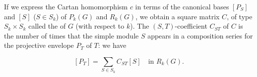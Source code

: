 If we express the Cartan homomorphism $c$ in terms of the canonical bases $[P_S]$ and $[S]$ ($S \in S_k$) of $P_k(G)$ and $R_k(G)$, we obtain a square matrix $C$, of type $S_k \times S_k$ called the  of $G$ (with respect to $k$). The $(S,T)$-coefficient $C_{ST}$ of $C$ is the number of times that the simple module $S$ appears in a composition series for the projective envelope $P_T$ of $T$: we have

$$[P_T] = \sum_{S \in S_k} C_{ST}[S] \quad \text{in } R_k(G).$$
